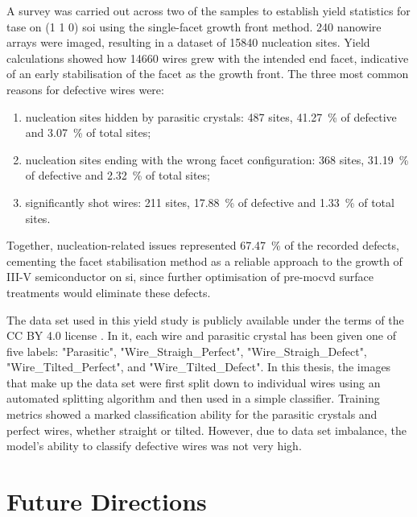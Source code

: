A survey was carried out across two of the samples to establish yield statistics for \acs{tase} on \hkl(1 1 0) \acs{soi} using the single-facet  growth front method. \num{240} nanowire arrays were imaged, resulting in a dataset of \num{15840} nucleation sites. Yield calculations showed how \num{14660} wires grew with the intended end facet, indicative of an early stabilisation of the  facet as the growth front. The three most common reasons for defective wires were:

\begin{enumerate}
    \item nucleation sites hidden by parasitic crystals: \num{487} sites, \qty{41.27}{\percent} of defective and \qty{3.07}{\percent} of total sites;
    \item nucleation sites ending with the wrong facet configuration: \num{368} sites, \qty{31.19}{\percent} of defective and \qty{2.32}{\percent} of total sites;
    \item significantly shot wires: \num{211} sites, \qty{17.88}{\percent} of defective and \qty{1.33}{\percent} of total sites.
\end{enumerate}

Together, nucleation-related issues represented \qty{67.47}{\percent} of the recorded defects, cementing the facet stabilisation method as a reliable approach to the growth of III-V semiconductor on \acl{si}, since further optimisation of pre-\acs{mocvd} surface treatments would eliminate these defects.

The data set used in this yield study is publicly available \cite{dataset} under the terms of the CC BY 4.0 license \cite{CCBY40}. In it, each wire and parasitic crystal has been given one of five labels: "Parasitic", "Wire\_Straigh\_Perfect", "Wire\_Straigh\_Defect", "Wire\_Tilted\_Perfect", and "Wire\_Tilted\_Defect". In this thesis, the images that make up the data set were first split down to individual wires using an automated splitting algorithm \cite{code} and then used in a simple classifier. Training metrics showed a marked classification ability for the parasitic crystals and perfect wires, whether straight or tilted. However, due to data set imbalance, the model's ability to classify defective wires was not very high.

\section{Future Directions}

